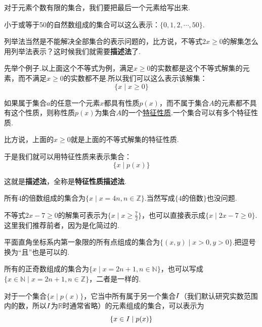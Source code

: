 \documentclass[lang=cn,math=cm,chinesefont=nofont,11pt,scheme=chinese,twocol]{elegantbook}
\begin{document}
对于元素个数有限的集合，我们要把最后一个元素给写出来.
\begin{example}
  小于或等于50的自然数组成的集合可以这么表示：$\{0,1,2,\cdots,50\}$.
\end{example}


列举法当然是不能解决全部集合的表示问题的，比方说，不等式$2x\geq 0$的解集怎么用列举法表示？这时候我们就需要\textbf{描述法}了.

先举个例子.以上面这个不等式为例，满足$x\geq 0$的实数都是这个不等式解集的元素，而不满足$x\geq 0$的实数都不是.所以我们可以这么表示该解集：
$$\{x\mid x\geq0\}$$

\begin{definition}[特征性质]
如果属于集合$a$的任意一个元素$x$都具有性质$p(x)$，而不属于集合$A$的元素都不具有这个性质，则称性质$p(x)$为集合$A$的一个\underline{特征性质}.一个集合可以有多个特征性质.
\end{definition}
比方说，上面的$x\geq 0$就是上面的不等式解集的特征性质.

于是我们就可以用特征性质来表示集合：$$\{x\mid p(x)\}$$

这就是\textbf{描述法}，全称是\textbf{特征性质描述法}.

\begin{example}
  所有4的倍数组成的集合为$\{x\mid x=4n,n\in\mathbb{Z}\}$.当然写成$\{\text{4的倍数}\}$也没问题.
\end{example}

\begin{example}
  不等式$2x-7\geq 0$的解集可表示为$\{x\mid x\geq\frac{7}{2}\}$，也可以直接表示成$\{x\mid 2x-7\geq 0\}$.这里我们推荐前者，因为是化简过的.
\end{example}

\begin{example}
  平面直角坐标系内第一象限的所有点组成的集合为$\{(x,y)\mid x>0,y>0\}$.把逗号换为“且”也是可以的.
\end{example}

\begin{example}
  所有的正奇数组成的集合为$\{x\mid x=2n+1,n\in\mathbb{N}\}$，也可以写成$\{x\in\mathbb{N}\mid x=2n+1,n\in\mathbb{Z}\}$，二者是一样的.
\end{example}

\begin{remark}
  对于一个集合$\{x\mid p(x)\}$，它当中所有属于另一个集合$\boldmath{I}$（我们默认研究实数范围内的数，所以$\boldmath{I}$为$\mathbb{R}$时通常省略）的元素组成的集合，可以表示为$$\{x\in\boldmath{I}\mid p(x)\}$$
\end{remark}
\end{document}
